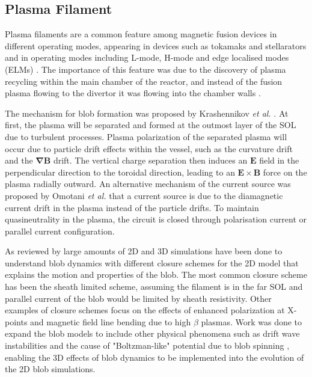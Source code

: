 \documentclass{article}
\begin{document}
\subsection*{Plasma Filament}
Plasma filaments are a common feature among magnetic fusion devices in different operating modes, appearing in devices such as tokamaks and stellarators and in operating modes including L-mode, H-mode and edge localised modes (ELMs) \cite{ben_ayed_inter-elm_2009, killer_plasma_2020, boedo_transport_2003}. The importance of this feature was due to the discovery of plasma recycling within the main chamber of the reactor, and instead of the fusion plasma flowing to the divertor it was flowing into the chamber walls \cite{krasheninnikov_recent_2008,dippolito_convective_2011}.

The mechanism for blob formation was proposed by Krashennikov \textit{et al.} \cite{krasheninnikov_recent_2008, krasheninnikov_scrape_2001}. At first, the plasma will be separated and formed at the outmost layer of the SOL due to turbulent processes. Plasma polarization of the separated plasma will occur due to particle drift effects within the vessel, such as the curvature drift and the $\bm{\nabla B}$ drift. The vertical charge separation then induces an $\bm{E}$ field in the perpendicular direction to the toroidal direction, leading to an $\bm{E}\times\bm{B}$ force on the plasma radially outward. An alternative mechanism of the current source was proposed by Omotani \textit{et al.} that a current source is due to the diamagnetic current drift in the plasma instead of the particle drifts. To maintain quasineutrality in the plasma, the circuit is closed through polarisation current or parallel current configuration.

As reviewed by \cite{dippolito_convective_2011} large amounts of 2D and 3D simulations have been done to understand blob dynamics with different closure schemes for the 2D model that explains the motion and properties of the blob. The most common closure scheme has been the sheath limited scheme, assuming the filament is in the far SOL and parallel current of the blob would be limited by sheath resistivity. Other examples of closure schemes focus on the effects of enhanced polarization at X-points and magnetic field line bending due to high $\beta$ plasmas\cite{krasheninnikov_recent_2008}. Work was done to expand the blob models to include other physical phenomena such as drift wave instabilities \cite{angus_effect_2012} and the cause of "Boltzman-like" potential due to blob spinning \cite{angus_effects_2012}, enabling the 3D effects of blob dynamics to be implemented into the evolution of the 2D blob simulations.
\end{document}
